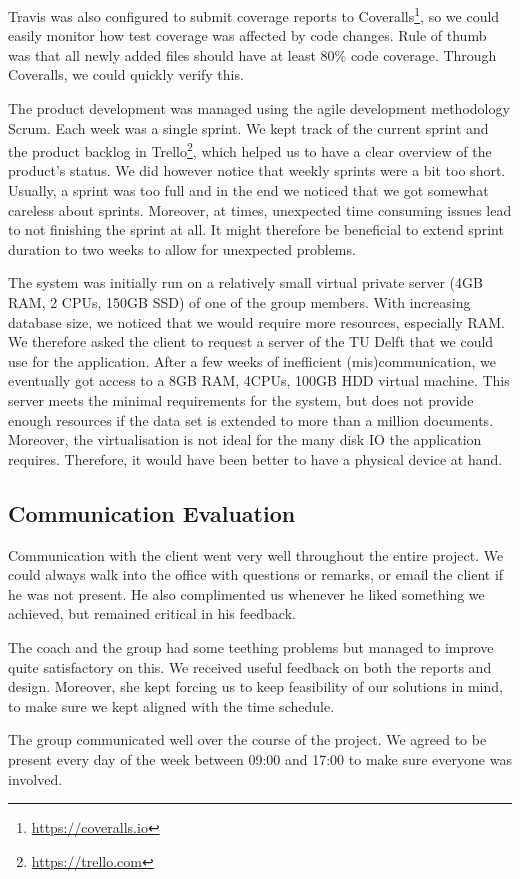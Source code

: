 Travis was also configured to submit coverage reports to Coveralls\footnote{\url{https://coveralls.io}}, so we could easily monitor how test coverage was affected by code changes. Rule of thumb was that all newly added files should have at least 80\% code coverage. Through Coveralls, we could quickly verify this. 

The product development was managed using the agile development methodology Scrum. Each week was a single sprint. We kept track of the current sprint and the product backlog in Trello\footnote{\url{https://trello.com}}, which helped us to have a clear overview of the product's status. We did however notice that weekly sprints were a bit too short. Usually, a sprint was too full and in the end we noticed that we got somewhat careless about sprints. Moreover, at times, unexpected time consuming issues lead to not finishing the sprint at all. It might therefore be beneficial to extend sprint duration to two weeks to allow for unexpected problems.

The system was initially run on a relatively small virtual private server (4GB RAM, 2 CPUs, 150GB SSD) of one of the group members. With increasing database size, we noticed that we would require more resources, especially RAM. We therefore asked the client to request a server of the TU Delft that we could use for the application. After a few weeks of inefficient (mis)communication, we eventually got access to a 8GB RAM, 4CPUs, 100GB HDD virtual machine. This server meets the minimal requirements for the system, but does not provide enough resources if the data set is extended to more than a million documents. Moreover, the virtualisation is not ideal for the many disk IO the application requires. Therefore, it would have been better to have a physical device at hand.

\subsection{Communication Evaluation}
Communication with the client went very well throughout the entire project. We could always walk into the office with questions or remarks, or email the client if he was not present. He also complimented us whenever he liked something we achieved, but remained critical in his feedback.

The coach and the group had some teething problems but managed to improve quite satisfactory on this. We received useful feedback on both the reports and design. Moreover, she kept forcing us to keep feasibility of our solutions in mind, to make sure we kept aligned with the time schedule.

The group communicated well over the course of the project. We agreed to be present every day of the week between 09:00 and 17:00 to make sure everyone was involved.